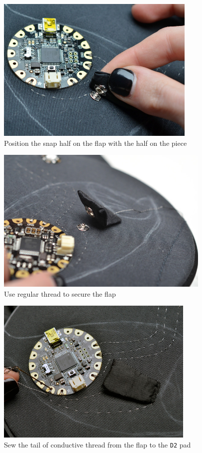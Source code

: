 \documentclass[letterpaper,twoside,12pt]{article}
\begin{document}
\begin{figure}[hbpt]\begin{centering}%
\includegraphics[height=2.75in]{flora-angler-embroidery-22.jpg}
\caption{Position the snap half on the flap with the half on the piece}
\label{fig:flora-angler-embroidery-22}
\end{centering}\end{figure}
\begin{figure}[hbpt]\begin{centering}%
\includegraphics[height=2.75in]{flora-angler-embroidery-23.jpg}
\caption{Use regular thread to secure the flap}
\label{fig:flora-angler-embroidery-23}
\end{centering}\end{figure}
\begin{figure}[hbpt]\begin{centering}%
\includegraphics[height=2.75in]{flora-angler-embroidery-24.jpg}
\caption{Sew the tail of conductive thread from the flap to the \texttt{D2} pad}
\label{fig:flora-angler-embroidery-24}
\end{centering}\end{figure}
\clearpage
\end{document}
